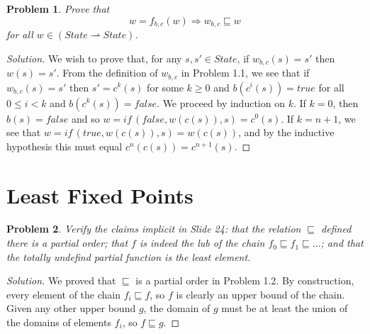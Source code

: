 \documentclass{article}
\newtheorem{problem}{Problem}[section]}
\newcommand{\pf}{\rightharpoonup}
\begin{document}
\begin{problem}
    Prove that
    \[
        w=f_{b,c}(w) \Longrightarrow w_{b,c}\sqsubseteq w
    \]
    for all $w\in (State\pf State)$.
\end{problem}
\begin{proof}[Solution]
    We wish to prove that, for any $s,s'\in State$, if $w_{b,c}(s)=s'$ then
    $w(s)=s'$. From the definition of $w_{b,c}$ in Problem 1.1, we see that if
    $w_{b,c}(s)=s'$ then $s'=c^k(s)$ for some $k\geq 0$ and $b(c^i(s))=true$ for
    all $0\leq i<k$ and $b(c^k(s))=false$. We proceed by induction on $k$. If
    $k=0$, then $b(s)=false$ and so $w=\textit{if}\,(false,w(c(s)),s)=c^0(s)$.
    If $k=n+1$, we see that $w=\textit{if}\,(true,w(c(s)),s)=w(c(s))$, and by
    the inductive hypothesis this must equal $c^n(c(s))=c^{n+1}(s)$.
\end{proof}

\section{Least Fixed Points}

\begin{problem}
    Verify the claims implicit in Slide 24: that the relation $\sqsubseteq$
    defined there is a partial order; that $f$ is indeed the lub of the chain
    $f_0\sqsubseteq f_1\sqsubseteq \dots$; and that the totally undefind partial
    function is the least element.
\end{problem}
\begin{proof}[Solution]
        We proved that $\sqsubseteq$ is a partial order in Problem 1.2. By
        construction, every element of the chain $f_i\sqsubseteq f$, so $f$ is
        clearly an upper bound of the chain. Given any other upper bound $g$,
        the domain of $g$ must be at least the union of the domains of elements
        $f_i$, so $f\sqsubseteq g$.
\end{proof}
\end{document}
